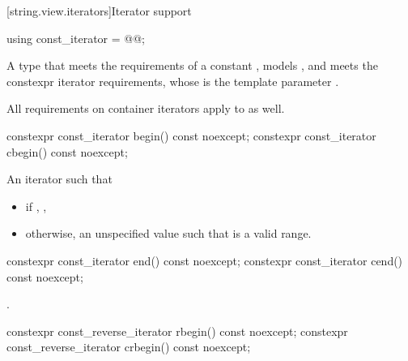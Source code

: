 [string.view.iterators]{Iterator support}

%
\begin{itemdecl}
using const_iterator = @@;
\end{itemdecl}

\begin{itemdescr}
\pnum
A type that meets the requirements
of a constant
,
models , and
meets the constexpr iterator requirements,
whose  is the template parameter .

\pnum
All requirements on container iterators apply to  as well.
\end{itemdescr}

%
%
\begin{itemdecl}
constexpr const_iterator begin() const noexcept;
constexpr const_iterator cbegin() const noexcept;
\end{itemdecl}

\begin{itemdescr}
\pnum
\returns
An iterator such that
\begin{itemize}
\item if , ,
\item otherwise, an unspecified value such that  is a valid range.
\end{itemize}
\end{itemdescr}

%
%
\begin{itemdecl}
constexpr const_iterator end() const noexcept;
constexpr const_iterator cend() const noexcept;
\end{itemdecl}

\begin{itemdescr}
\pnum
\returns
{}.
\end{itemdescr}

%
%
\begin{itemdecl}
constexpr const_reverse_iterator rbegin() const noexcept;
constexpr const_reverse_iterator crbegin() const noexcept;
\end{itemdecl}

